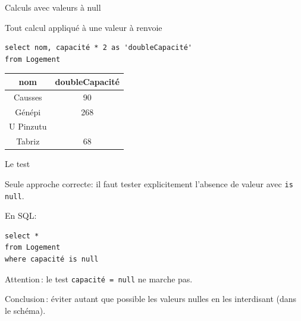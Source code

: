 \begin{frame}[fragile]{Calculs avec valeurs à null}

Tout calcul appliqué à une valeur à  renvoie 
\vfill


\begin{verbatim}
select nom, capacité * 2 as 'doubleCapacité'
from Logement
\end{verbatim}

\vfill
\begin{tabular}{c|c}
\textbf{nom} & \textbf{doubleCapacité}\\ \hline 
Causses & 90\\ \hline 
Génépi & 268\\ \hline 
U Pinzutu & \\ \hline 
Tabriz & 68\\ \hline 
\end{tabular}

\end{frame}

\begin{frame}[fragile]{Le test }

Seule approche correcte: il faut tester explicitement l'absence de valeur avec \texttt{is null}.

\vfill
En SQL: 

\begin{verbatim}
select *
from Logement
where capacité is null
\end{verbatim}

\vfill

\alert{Attention}\,: le test \texttt{capacité = null} \alert{ne marche pas}.

\vfill

\alert{Conclusion}\,: éviter autant que possible les valeurs nulles
en les interdisant (dans le schéma).
\end{frame}

